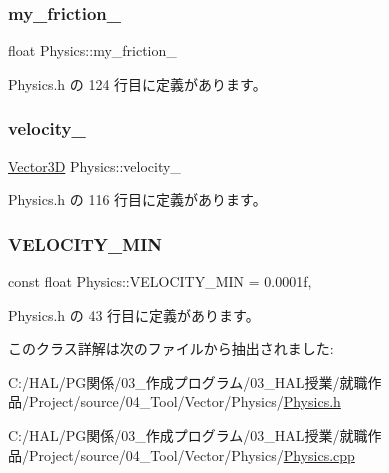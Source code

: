 \subsubsection{\texorpdfstring{my\+\_\+friction\+\_\+}{my\_friction\_}}
{\footnotesize\ttfamily float Physics\+::my\+\_\+friction\+\_\+\hspace{0.3cm}{\ttfamily [private]}}



 Physics.\+h の 124 行目に定義があります。

\mbox{\label{class_physics_a9818c603a813d8f70254812f43e67b3e}} 
\subsubsection{\texorpdfstring{velocity\+\_\+}{velocity\_}}
{\footnotesize\ttfamily \mbox{\hyperlink{class_vector3_d}{Vector3D}} Physics\+::velocity\+\_\+\hspace{0.3cm}{\ttfamily [private]}}



 Physics.\+h の 116 行目に定義があります。

\mbox{\label{class_physics_a84ba24f3a5b31888a654c6750fb24faf}} 
\subsubsection{\texorpdfstring{V\+E\+L\+O\+C\+I\+T\+Y\+\_\+\+M\+IN}{VELOCITY\_MIN}}
{\footnotesize\ttfamily const float Physics\+::\+V\+E\+L\+O\+C\+I\+T\+Y\+\_\+\+M\+IN = 0.\+0001f\hspace{0.3cm}{\ttfamily [static]}, {\ttfamily [private]}}



 Physics.\+h の 43 行目に定義があります。



このクラス詳解は次のファイルから抽出されました\+:\begin{DoxyCompactItemize}
\item 
C\+:/\+H\+A\+L/\+P\+G関係/03\+\_\+作成プログラム/03\+\_\+\+H\+A\+L授業/就職作品/\+Project/source/04\+\_\+\+Tool/\+Vector/\+Physics/\mbox{\hyperlink{_physics_8h}{Physics.\+h}}\item 
C\+:/\+H\+A\+L/\+P\+G関係/03\+\_\+作成プログラム/03\+\_\+\+H\+A\+L授業/就職作品/\+Project/source/04\+\_\+\+Tool/\+Vector/\+Physics/\mbox{\hyperlink{_physics_8cpp}{Physics.\+cpp}}\end{DoxyCompactItemize}
